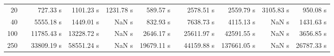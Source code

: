 {\begin{table}[h]
\begin{tabular}{rr rrrr r rrrr}
20 & & 727.33 s & 1101.23 s & 1231.78 s & 589.57 s && 2578.51 s & 2559.79 s & 3105.83 s & 950.08 s \\ 
40 & & 5555.18 s & 1449.01 s &  NaN s & 832.93 s && 7638.73 s & 4115.13 s &  NaN s & 1431.63 s \\ 
100 & & 11785.43 s & 13228.72 s &  NaN s & 2646.17 s && 25611.97 s & 42591.55 s &  NaN s & 3656.85 s \\ 
250 & & 33809.19 s & 58551.24 s &  NaN s & 19679.11 s && 44159.88 s & 137661.05 s &  NaN s & 26787.33 s \\ 
\hline 
\end{tabular} 
\end{table} 
} 
